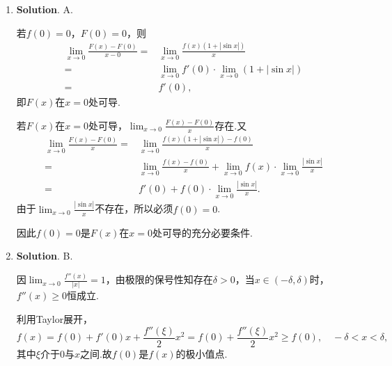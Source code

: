 \documentclass[../main.tex]{subfiles}
\begin{document}
\begin{enumerate}
    \item \textbf{Solution}. A.

          若$f(0)=0$，$F(0)=0$，则
          \[
              \begin{aligned}
                  \lim_{x\to0}\frac{F(x)-F(0)}{x-0}= {} & \lim_{x\to0}\frac{f(x)(1+|\sin x|)}{x}                    \\
                  = {}                                  & \lim_{x\to0}f'(0)\cdot\lim_{x\to0}\left(1+|\sin x|\right) \\
                  = {}                                  & f'(0),
              \end{aligned}
          \]
          即$F(x)$在$x=0$处可导.

          若$F(x)$在$x=0$处可导，$\lim_{x\to0}\frac{F(x)-F(0)}{x}$存在.又
          \[
              \begin{aligned}
                  \lim_{x\to0}\frac{F(x)-F(0)}{x}= {} & \lim_{x\to0}\frac{f(x)(1+|\sin x|)-f(0)}{x}                                         \\
                  = {}                                & \lim_{x\to0}\frac{f(x)-f(0)}{x}+\lim_{x\to0}f(x)\cdot\lim_{x\to0}\frac{|\sin x|}{x} \\
                  = {}                                & f'(0)+f(0)\cdot\lim_{x\to0}\frac{|\sin x|}{x}.
              \end{aligned}
          \]
          由于$\lim_{x\to0}\frac{|\sin x|}{x}$不存在，所以必须$f(0)=0$.

          因此$f(0)=0$是$F(x)$在$x=0$处可导的充分必要条件.

    \item \textbf{Solution}. B.

          因$\lim_{x\to0}\frac{f''(x)}{|x|}=1$，由极限的保号性知存在$\delta>0$，当$x\in
              (-\delta,\delta)$时，$f''(x)\geq0$恒成立.

          利用Taylor展开，
          \[
              f(x)=f(0)+f'(0)x+\frac{f''(\xi)}{2}x^{2}=f(0)+\frac{f''(\xi)}{2}x^{2} \geq
              f(0), \quad -\delta<x<\delta,
          \]
          其中$\xi$介于$0$与$x$之间.故$f(0)$是$f(x)$的极小值点.
\end{enumerate}
\end{document}
